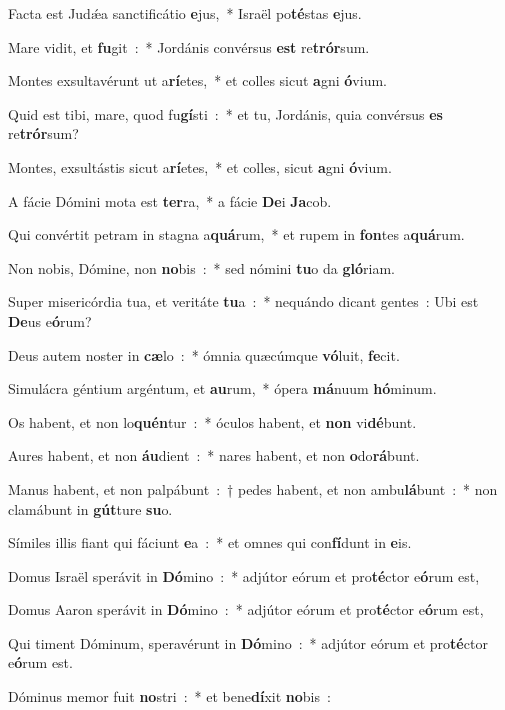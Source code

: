 ﻿\item Facta est Judǽa sanctificátio \textbf{e}jus,~* Israël po\textbf{té}stas \textbf{e}jus.
\item Mare vidit, et \textbf{fu}git~:~* Jordánis convérsus \textbf{est} re\-\textbf{trór}\-sum.
\item Montes exsultavérunt ut a\textbf{rí}etes,~* et colles sicut \textbf{a}gni \textbf{ó}\-vi\-um.
\item Quid est tibi, mare, quod fu\textbf{gí}sti~:~* et tu, Jordánis, quia convérsus \textbf{es} re\textbf{trór}sum?
\item Montes, exsultástis sicut a\textbf{rí}etes,~* et colles, sicut \textbf{a}gni \textbf{ó}\-vi\-um.
\item A fácie Dómini mota est \textbf{ter}ra,~* a fácie \textbf{De}i \textbf{Ja}cob.
\item Qui convértit petram in stagna a\textbf{quá}rum,~* et rupem in \textbf{fon}tes a\textbf{quá}rum.
\item Non nobis, Dómine, non \textbf{no}bis~:~* sed nómini \textbf{tu}o da \textbf{gló}riam.
\item Super misericórdia tua, et veritáte \textbf{tu}a~:~* nequándo dicant gentes~: Ubi est \textbf{De}us e\textbf{ó}rum?
\item Deus autem noster in \textbf{cæ}lo~:~* ómnia quæcúmque \textbf{vó}\-lu\-it, \textbf{fe}cit.
\item Simulácra géntium argéntum, et \textbf{au}rum,~* ópera \textbf{má}\-nu\-um \textbf{hó}minum.
\item Os habent, et non lo\textbf{quén}tur~:~* óculos habent, et \textbf{non} vi\textbf{dé}bunt.
\item Aures habent, et non \textbf{áu}dient~:~* nares habent, et non \textbf{o}do\textbf{rá}bunt.
\item Manus habent, et non palpábunt~:~† pedes habent, et non ambu\textbf{lá}bunt~:~* non clamábunt in \textbf{gút}ture \textbf{su}o.
\item Símiles illis fiant qui fáciunt \textbf{e}a~:~* et omnes qui con\-\textbf{fí}\-dunt in \textbf{e}is.
\item Domus Israël sperávit in \textbf{Dó}mino~:~* adjútor eórum et pro\textbf{té}ctor e\textbf{ó}rum est,
\item Domus Aaron sperávit in \textbf{Dó}mino~:~* adjútor eórum et pro\textbf{té}ctor e\textbf{ó}rum est,
\item Qui timent Dóminum, speravérunt in \textbf{Dó}mino~:~* adjútor eórum et pro\textbf{té}ctor e\textbf{ó}rum est.
\item Dóminus memor fuit \textbf{no}stri~:~* et bene\textbf{dí}xit \textbf{no}bis~:
